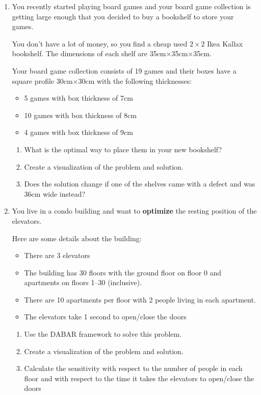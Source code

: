 \begin{enumerate}
	\item\label{q1} You recently started playing board games and your board game collection is getting large enough that you decided to buy a bookshelf to store your games. 
	
	You don't have a lot of money, so you find a cheap used $2 \times 2$ Ikea Kallax bookshelf.
	The dimensions of each shelf are 35cm$\times$35cm$\times$35cm.
	
	Your board game collection consists of 19 games and their boxes have a square profile 30cm$\times$30cm with the following thicknesses:
	\begin{itemize}
		\item 5 games with box thickness of 7cm
		\item 10 games with box thickness of 8cm
		\item 4 games with box thickness of 9cm
	\end{itemize}

	\begin{enumerate}
		\item What is the optimal way to place them in your new bookshelf?
		\item Create a visualization of the problem and solution.

		\item Does the solution change if one of the shelves came with a defect and was 36cm wide instead?
	\end{enumerate}


\vfil 

\item \label{q2} You live in a condo building and want to \textbf{optimize} the resting position of the elevators.

	Here are some details about the building:
	\begin{itemize}
		\item There are 3 elevators
		\item The building has 30 floors with the ground floor on floor 0 and apartments on floors 1--30 (inclusive).
		\item There are 10 apartments per floor with 2 people living in each apartment.
		\item The elevators take 1 second to open/close the doors
	\end{itemize}

	\begin{enumerate}
		\item Use the DABAR framework to solve this problem.
		\item Create a visualization of the problem and solution.
		\item Calculate the sensitivity with respect to the number of people in each floor and with respect to the time it takes the elevators to open/close the doors
	\end{enumerate}
	
	

	
	



	
	
	
	
	
\end{enumerate}

















